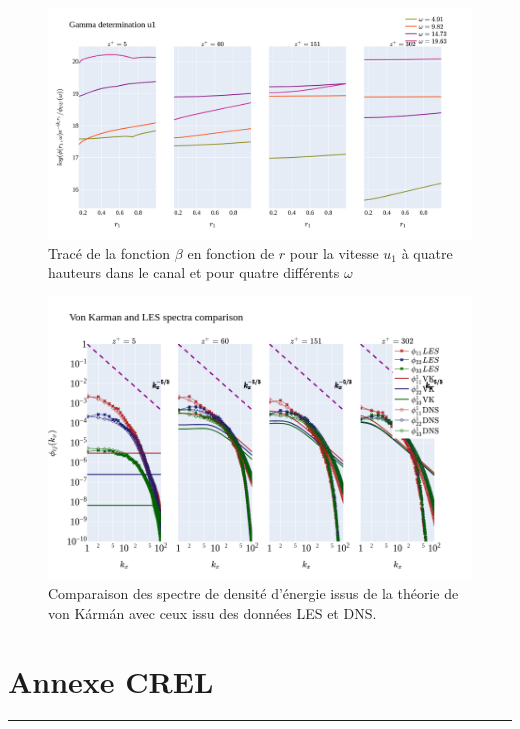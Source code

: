 \documentclass[12pt]{article}
\theoremstyle{plain}
\theoremstyle{remark}
\begin{document}
\begin{figure}[H]
	\begin{center}
		\includegraphics[width=0.9\linewidth]{../../output/figures/channel_wrles_retau395/split_time/gamma/gamma_u1_r.png}
		\caption{Tracé de la fonction $\beta$ en fonction de $r$ pour la vitesse $u_1$ à quatre hauteurs dans le canal et pour quatre différents $\omega$}
		\label{fig:gamma_r}
	\end{center}
\end{figure}

\begin{figure}[H]
	\begin{center}
		\includegraphics[width=0.9\linewidth]{../../output/figures/channel_wrles_retau395/split_time/von_karman/von_karman_spectra.png}
		\caption{Comparaison des spectre de densité d'énergie issus de la théorie de von Kármán avec ceux issu des données LES et DNS.}
		\label{fig:vk_spectra_zoom}
	\end{center}
\end{figure}

\pagebreak


\section{Annexe CREL}
\noindent\rule{\linewidth}{2pt}
\vspace{0.1cm}

\pagebreak


	
	
\end{document}
